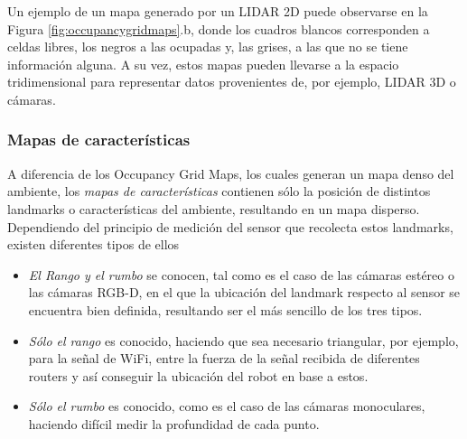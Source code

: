 Un ejemplo de un mapa generado por un LIDAR 2D puede observarse en la Figura \ref{fig:occupancygridmaps}.b, donde los cuadros blancos corresponden a celdas libres, los negros a las ocupadas y, las grises, a las que no se tiene información alguna. A su vez, estos mapas pueden llevarse a la espacio tridimensional para representar datos provenientes de, por ejemplo, LIDAR 3D o cámaras.

\subsubsection{Mapas de características}
A diferencia de los Occupancy Grid Maps, los cuales generan un mapa denso del ambiente, los \textit{mapas de características} contienen sólo la posición de distintos landmarks o características del ambiente, resultando en un mapa disperso. 
Dependiendo del principio de medición del sensor que recolecta estos landmarks, existen diferentes tipos de ellos
\begin{itemize}
    \item \textit{El Rango y el rumbo} se conocen, tal como es el caso de las cámaras estéreo o las cámaras RGB-D, en el que la ubicación del landmark respecto al sensor se encuentra bien definida, resultando ser el más sencillo de los tres tipos. 
    \item \textit{Sólo el rango} es conocido,
    haciendo que sea necesario triangular, por ejemplo, para la señal de WiFi, entre la fuerza de la señal recibida de diferentes routers y así conseguir la ubicación del robot en base a estos.
    \item \textit{Sólo el rumbo} es conocido,
    como es el caso de las cámaras monoculares, haciendo difícil medir la profundidad de cada punto.
\end{itemize}


